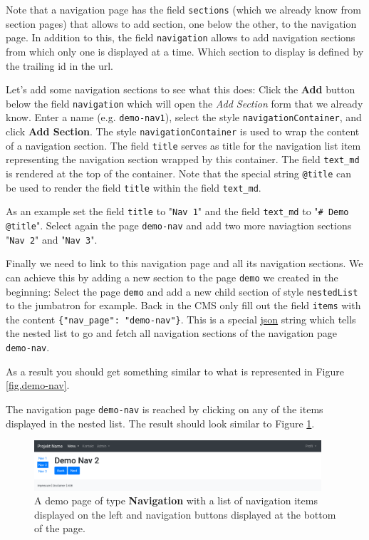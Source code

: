 \documentclass[a4paper,oneside]{book}
\begin{document}
Note that a navigation page has the field \texttt{sections} (which we already know from section pages) that allows to add section, one below the other, to the navigation page.
In addition to this, the field \texttt{navigation} allows to add navigation sections from which only one is displayed at a time.
Which section to display is defined by the trailing id in the url.

Let's add some navigation sections to see what this does:
Click the \textbf{Add} button below the field \texttt{navigation} which will open the \emph{Add Section} form that we already know.
Enter a name (e.g. \texttt{demo-nav1}), select the style \texttt{navigationContainer}, and click \textbf{Add Section}.
The style \texttt{navigationContainer} is used to wrap the content of a navigation section.
The field \texttt{title} serves as title for the navigation list item representing the navigation section wrapped by this container.
The field \texttt{text\_md} is rendered at the top of the container.
Note that the special string \texttt{@title} can be used to render the field \texttt{title} within the field \texttt{text\_md}.

As an example set the field \texttt{title} to "\texttt{Nav 1}" and the field \texttt{text\_md} to "\texttt{\# Demo @title}".
Select again the page \texttt{demo-nav} and add two more naviagtion sections "\texttt{Nav 2}" and "\texttt{Nav 3}".

Finally we need to link to this navigation page and all its navigation sections.
We can achieve this by adding a new section to the page \texttt{demo} we created in the beginning:
Select the page \texttt{demo} and add a new child section of style \texttt{nestedList} to the jumbatron for example.
Back in the CMS only fill out the field \texttt{items} with the content \texttt{\{"nav\_page": "demo-nav"\}}.
This is a special \href{http://www.json.org/}{json} string which tells the nested list to go and fetch all navigation sections of the navigation page \texttt{demo-nav}.

As a result you should get something similar to what is represented in Figure \ref{fig.demo-nav}.

The navigation page \texttt{demo-nav} is reached by clicking on any of the items displayed in the nested list.
The result should look similar to Figure \ref{fig.demo-nav-page}.

\begin{figure}[ht]
    \centering
    \includegraphics[width=0.95\textwidth]{demo-nav-page.png}
    \caption{A demo page of type \textbf{Navigation} with a list of navigation items displayed on the left and navigation buttons displayed at the bottom of the page.}
    \label{fig.demo-nav-page}
\end{figure}
\end{document}
